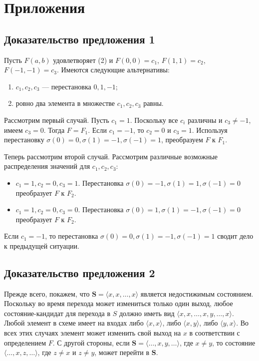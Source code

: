 \documentclass[a4paper,12pt]{article}
\begin{document}
\section*{Приложения}

\subsection*{Доказательство предложения 1}

Пусть $F(a,b)$ удовлетворяет (2) и $F(0,0) = c_1$, $F(1,1) = c_2$, $F(-1,-1) = c_3$. Имеются следующие альтернативы:
\begin{enumerate}
\item $c_1, c_2, c_3$ — перестановка $0,1,-1$;
\item ровно два элемента в множестве $c_1, c_2, c_3$ равны.
\end{enumerate}

Рассмотрим первый случай. Пусть $c_1 = 1$. Поскольку все $c_i$ различны и $c_3 \neq -1$, имеем $c_3 = 0$. Тогда $F = F_1$. Если $c_1 = -1$, то $c_2 = 0$ и $c_3 = 1$. Используя перестановку $\sigma(0) = 0, \sigma(1) = -1, \sigma(-1) = 1$, преобразуем $F$ к $F_1$.

Теперь рассмотрим второй случай. Рассмотрим различные возможные распределения значений для $c_1, c_2, c_3$:
\begin{itemize}
\item $c_1 = 1, c_2 = 0, c_3 = 1$. Перестановка $\sigma(0) = -1, \sigma(1) = 1, \sigma(-1) = 0$ преобразует $F$ к $F_2$.
\item $c_1 = 1, c_2 = 0, c_3 = 0$. Перестановка $\sigma(0) = 1, \sigma(1) = -1, \sigma(-1) = 0$ преобразует $F$ к $F_2$.
\end{itemize}
Если $c_1 = -1$, то перестановка $\sigma(0) = 0, \sigma(1) = -1, \sigma(-1) = 1$ сводит дело к предыдущей ситуации.

\subsection*{Доказательство предложения 2}

Прежде всего, покажем, что $\mathbf{S} = \langle x, x, \ldots, x \rangle$ является недостижимым состоянием. Поскольку во время перехода может измениться только один выход, любое состояние-кандидат для перехода в $S$ должно иметь вид $\langle x, x, \ldots, x, y, \ldots, x \rangle$. Любой элемент в схеме имеет на входах либо $\langle x, x \rangle$, либо $\langle x, y \rangle$, либо $\langle y, x \rangle$. Во всех этих случаях элемент может изменить свой выход на $x$ в соответствии с определением $F$. С другой стороны, если $\mathbf{S} = \langle \ldots, x, y, \ldots \rangle$, где $x \neq y$, то состояние $\langle \ldots, x, z, \ldots \rangle$, где $z \neq x$ и $z \neq y$, может перейти в $\mathbf{S}$.
\end{document}

